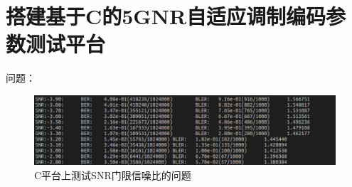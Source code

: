 \documentclass{article}
\begin{document}
\section{搭建基于C的5GNR自适应调制编码参数测试平台}
问题：
\begin{figure}[H]
	\centering
	\includegraphics[width = \textwidth]{problem.png}
	\caption{C平台上测试SNR门限信噪比的问题}
\end{figure}


\end{document}
